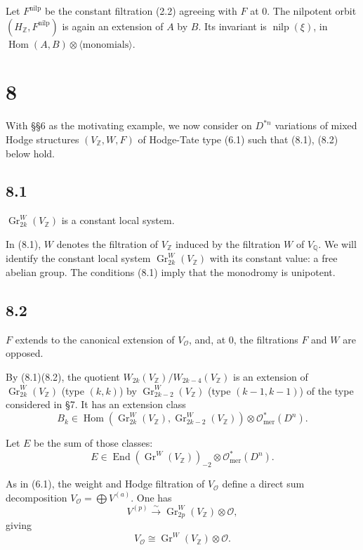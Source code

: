 \documentclass[11pt,a4paper]{article}
\theoremstyle{plain}
\theoremstyle{definition}
\DeclareMathOperator{\Hom}{Hom}
\DeclareMathOperator{\End}{End}
\DeclareMathOperator{\Gr}{Gr}
\DeclareMathOperator{\nilp}{nilp}
\begin{document}
Let $F^{\text{nilp}}$ be the constant filtration (2.2) agreeing with $F$ at 0. The nilpotent orbit $(H_{\mathbb{Z}}, F^{\text{nilp}})$ is again an extension of $A$ by $B$. Its invariant is $\nilp(\xi)$, in $\Hom(A,B) \otimes \langle\text{monomials}\rangle$.

\section{8}

With \S\S 6 as the motivating example, we now consider on $D^{*n}$ variations of mixed Hodge structures $(V_{\mathbb{Z}}, W, F)$ of Hodge-Tate type (6.1) such that (8.1), (8.2) below hold.

\subsection*{8.1}
$\Gr_{2k}^{W}(V_{\mathbb{Z}})$ is a constant local system.

In (8.1), $W$ denotes the filtration of $V_{\mathbb{Z}}$ induced by the filtration $W$ of $V_{\mathbb{Q}}$. We will identify the constant local system $\Gr_{2k}^{W}(V_{\mathbb{Z}})$ with its constant value: a free abelian group. The conditions (8.1) imply that the monodromy is unipotent.

\subsection*{8.2}
$F$ extends to the canonical extension of $V_{\mathcal{O}}$, and, at 0, the filtrations $F$ and $W$ are opposed.

By (8.1)(8.2), the quotient $W_{2k}(V_{\mathbb{Z}})/W_{2k-4}(V_{\mathbb{Z}})$ is an extension of $\Gr_{2k}^{W}(V_{\mathbb{Z}})$ (type $(k,k)$) by $\Gr_{2k-2}^{W}(V_{\mathbb{Z}})$ (type $(k-1,k-1)$) of the type considered in \S 7. It has an extension class
\[
B_{k} \in \Hom(\Gr_{2k}^{W}(V_{\mathbb{Z}}), \Gr_{2k-2}^{W}(V_{\mathbb{Z}})) \otimes \mathcal{O}_{\text{mer}}^{*}(D^{n}).
\]

Let $E$ be the sum of those classes:
\begin{equation}
E \in \End(\Gr^{W}(V_{\mathbb{Z}}))_{-2} \otimes \mathcal{O}_{\text{mer}}^{*}(D^{n}). \tag{8.3}
\end{equation}

As in (6.1), the weight and Hodge filtration of $V_{\mathcal{O}}$ define a direct sum decomposition $V_{\mathcal{O}} = \bigoplus V^{(a)}$. One has
\[
V^{(p)} \xrightarrow{\sim} \Gr_{2p}^{W}(V_{\mathbb{Z}}) \otimes \mathcal{O},
\]
giving
\begin{equation}
V_{\mathcal{O}} \cong \Gr^{W}(V_{\mathbb{Z}}) \otimes \mathcal{O}. \tag{8.4}
\end{equation}
\end{document}
